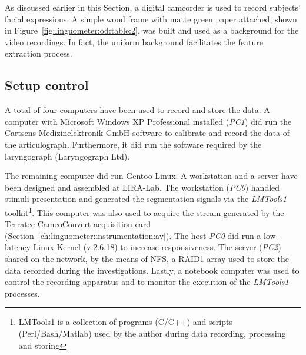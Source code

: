 As discussed earlier in this Section, a digital camcorder is used to record
subjects' facial expressions. A simple wood frame with matte green
paper attached, shown in Figure~\ref{fig:linguometer:od:table:2}, was built and
used as a background for the video recordings.
In fact, the uniform background facilitates the feature extraction process.
\subsection{Setup control}
\label{ch:linguometer:instrumentation:setup}
A total of four computers have been used to record and store the data.
A computer with Microsoft Windows XP Professional installed (\emph{PC1})
did run the Cartsens Medizinelektronik GmbH software to calibrate and record 
the data of the articulograph.
Furthermore, it did run the software required by the laryngograph
(Laryngograph Ltd).

The remaining computer did run Gentoo Linux. 
A workstation and a server have been designed and assembled at LIRA-Lab. 
The workstation (\emph{PC0}) handled stimuli presentation and generated the
segmentation signals via the \emph{LMTools1} 
toolkit\footnote{LMTools1 is a collection of programs (C/C++)
and scripts (Perl/Bash/Matlab) used by the author during data recording,
processing and storing}. This computer was also used to acquire the stream
generated by the Terratec CameoConvert acquisition card
(Section~\ref{ch:linguometer:instrumentation:av}).
The host \emph{PC0} did run a low-latency Linux 
Kernel (v.2.6.18) to increase responsiveness.
The server (\emph{PC2}) shared on the network, by the means of NFS,
a RAID1 array used to store the data recorded during the investigations.
Lastly, a notebook computer was used to control the recording
apparatus and to monitor the execution of the \emph{LMTools1} processes.
